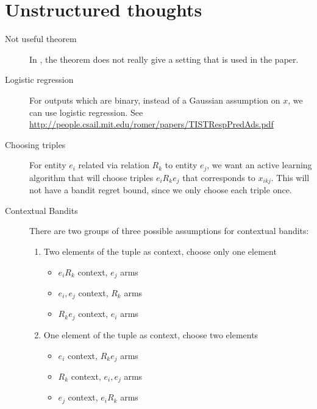 \section{Unstructured thoughts}

\begin{description}
  \item[Not useful theorem] In \cite{kawale2015efficient}, the theorem does not really give
  a setting that is used in the paper.
  \item[Logistic regression] For outputs which are binary, instead of a Gaussian assumption on
  $x$, we can use logistic regression. See
   \url{http://people.csail.mit.edu/romer/papers/TISTRespPredAds.pdf}
  \item[Choosing triples] For entity $e_i$ related via relation $R_k$ to entity $e_j$, we want
  an active learning algorithm that will choose triples $e_i R_k e_j$ that corresponds to
  $x_{ikj}$. This will not have a bandit regret bound, since we only choose each triple once.
  \item[Contextual Bandits] There are two groups of three possible assumptions for contextual
  bandits:
  \begin{enumerate}
    \item Two elements of the tuple as context, choose only one element
    \begin{itemize}
      \item $e_iR_k$ context, $e_j$ arms
      \item $e_i, e_j$ context, $R_k$ arms
      \item $R_ke_j$ context, $e_i$ arms
    \end{itemize}
    \item One element of the tuple as context, choose two elements
    \begin{itemize}
      \item $e_i$ context, $R_k e_j$ arms
      \item $R_k$ context, $e_i, e_j$ arms
      \item $e_j$ context, $e_iR_k$ arms
    \end{itemize}
  \end{enumerate}
\end{description}

